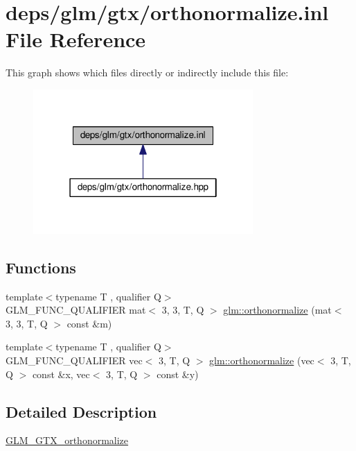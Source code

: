 \hypertarget{orthonormalize_8inl}{}\section{deps/glm/gtx/orthonormalize.inl File Reference}
\label{orthonormalize_8inl}
This graph shows which files directly or indirectly include this file\+:
\nopagebreak
\begin{figure}[H]
\begin{center}
\leavevmode
\includegraphics[width=238pt]{da/dfc/orthonormalize_8inl__dep__incl}
\end{center}
\end{figure}
\subsection*{Functions}
\begin{DoxyCompactItemize}
\item 
{\footnotesize template$<$typename T , qualifier Q$>$ }\\G\+L\+M\+\_\+\+F\+U\+N\+C\+\_\+\+Q\+U\+A\+L\+I\+F\+I\+ER mat$<$ 3, 3, T, Q $>$ \hyperlink{group__gtx__orthonormalize_ga4cab5d698e6e2eccea30c8e81c74371f}{glm\+::orthonormalize} (mat$<$ 3, 3, T, Q $>$ const \&m)
\item 
{\footnotesize template$<$typename T , qualifier Q$>$ }\\G\+L\+M\+\_\+\+F\+U\+N\+C\+\_\+\+Q\+U\+A\+L\+I\+F\+I\+ER vec$<$ 3, T, Q $>$ \hyperlink{group__gtx__orthonormalize_gac3bc7ef498815026bc3d361ae0b7138e}{glm\+::orthonormalize} (vec$<$ 3, T, Q $>$ const \&x, vec$<$ 3, T, Q $>$ const \&y)
\end{DoxyCompactItemize}


\subsection{Detailed Description}
\hyperlink{group__gtx__orthonormalize}{G\+L\+M\+\_\+\+G\+T\+X\+\_\+orthonormalize} 